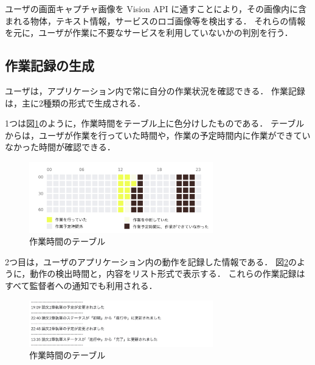 ユーザの画面キャプチャ画像を Vision API に通すことにより，その画像内に含まれる物体，テキスト情報，サービスのロゴ画像等を検出する．
それらの情報を元に，ユーザが作業に不要なサービスを利用していないかの判別を行う．

\subsection{作業記録の生成}
ユーザは，アプリケーション内で常に自分の作業状況を確認できる．
作業記録は，主に2種類の形式で生成される．

1つは図\ref{fig:activity_table}のように，作業時間をテーブル上に色分けしたものである．
テーブルからは，ユーザが作業を行っていた時間や，作業の予定時間内に作業ができていなかった時間が確認できる．

\begin{figure}[h]
  \begin{center}
  \includegraphics[width=8.0cm]{../graphics/activity_table.png}
  \caption{作業時間のテーブル}
  \label{fig:activity_table}
  \end{center}
\end{figure}

2つ目は，ユーザのアプリケーション内の動作を記録した情報である．
図\ref{fig:activity_log}のように，動作の検出時間と，内容をリスト形式で表示する．
これらの作業記録はすべて監督者への通知でも利用される．

\begin{figure}[h]
  \begin{center}
  \includegraphics[width=8.0cm]{../graphics/activity_log.png}
  \caption{作業時間のテーブル}
  \label{fig:activity_log}
  \end{center}
\end{figure}
